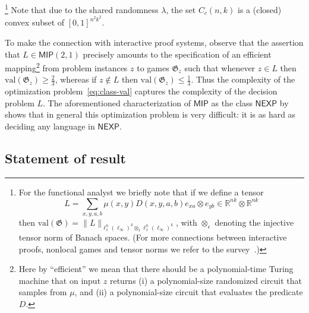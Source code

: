 \documentclass[11pt]{article}
\theoremstyle{definition}
\newcommand{\R}{\ensuremath{\mathbb{R}}}
\newcommand{\val}{\ensuremath{\mathrm{val}}}
\newcommand{\game}{\mathfrak{G}}
\newcommand{\class}[1]{\ensuremath{\mathsf{#1}}\xspace}
\newcommand{\NP}{\class{NP}} %
\newcommand{\NEXP}{\class{NEXP}} %
\newcommand{\MIP}{\class{MIP}} %
\begin{document}
\footnote{For the functional analyst we briefly note that if we define a tensor 
\[L  = \sum_{x,y,a,b} \mu(x,y)D(x,y,a,b) e_{xa}\otimes e_{yb} \in \R^{nk}\otimes \R^{nk}\]
then $\val(\game) = \|L\|_{\ell_1^n(\ell_\infty)^k \otimes_\epsilon \ell_1^n(\ell_\infty)^k}$, with $\otimes_\epsilon$ denoting the injective tensor norm of Banach spaces. (For more connections between interactive proofs, nonlocal games and tensor norms we refer to the survey~\cite{palazuelos2016survey}.)} Note that due to the shared randomness $\lambda$, the set $C_c(n,k)$ is a (closed) convex subset of $[0,1]^{n^2k^2}$. 

To make the connection with interactive proof systems, observe that the assertion that $L\in \MIP(2,1)$ precisely amounts to the specification of an efficient mapping\footnote{Here by ``efficient'' we mean that there should be a polynomial-time Turing machine that on input $z$ returns (i) a polynomial-size randomized circuit that samples from $\mu$, and (ii) a polynomial-size circuit that evaluates the predicate $D$.} from problem instances $z$ to games $\game_z$ such that whenever $z\in L$ then  $\val(\game_z) \geq \frac{2}{3}$, whereas if $z \notin L$ then $\val(\game_z) \leq \frac{1}{3}$. Thus the complexity of the optimization problem~\eqref{eq:class-val} captures the complexity of the decision problem $L$. The aforementioned characterization of $\MIP$ as the class $\NEXP$ by~\cite{babai1991non} shows that in general this optimization problem is very difficult: it is as hard as deciding any language in $\NEXP$. 


\subsection{Statement of result}
\label{sec:result}
\end{document}
